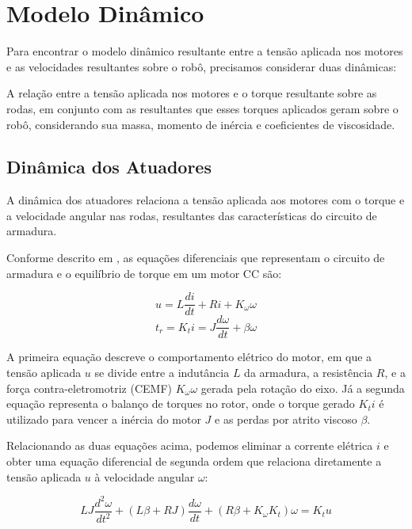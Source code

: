 \section{Modelo Dinâmico}

Para encontrar o modelo dinâmico resultante entre a tensão aplicada nos
motores e as velocidades resultantes sobre o robô, precisamos considerar duas dinâmicas:

\vspace{1em}
A relação entre a tensão aplicada nos motores e o torque resultante sobre as rodas,
em conjunto com as resultantes que esses torques aplicados geram sobre o robô, 
considerando sua massa, momento de inércia e coeficientes de viscosidade.

\subsection{Dinâmica dos Atuadores}

A dinâmica dos atuadores relaciona a tensão aplicada aos motores 
com o torque e a velocidade angular nas rodas, 
resultantes das características do circuito de armadura.

\vspace{1em}
Conforme descrito em \cite{ogata1997modern}, 
as equações diferenciais que representam o circuito de armadura e o equilíbrio de torque em um motor CC são:

\begin{equation}
    u = L \frac{di}{dt} + Ri + K_{\omega} \omega
\end{equation}
\begin{equation}
    t_r = K_{t} i = J \frac{d \omega}{dt} + \beta \omega
\end{equation}

A primeira equação descreve o comportamento elétrico do motor, 
em que a tensão aplicada $u$ se divide entre a indutância $L$ da armadura, 
a resistência $R$, e a força contra-eletromotriz (CEMF) $K_\omega \omega$ 
gerada pela rotação do eixo. Já a segunda equação representa o balanço 
de torques no rotor, onde o torque gerado $K_t i$ é utilizado para vencer 
a inércia do motor $J$ e as perdas por atrito viscoso $\beta$.

\vspace{1em}
Relacionando as duas equações acima, 
podemos eliminar a corrente elétrica $i$ e 
obter uma equação diferencial de segunda ordem que relaciona 
diretamente a tensão aplicada $u$ à velocidade angular $\omega$:

\begin{equation}
    L J \frac{d^2 \omega}{dt^2} + (L \beta + R J) \frac{d \omega}{dt} + (R \beta + K_{\omega} K_{t}) \omega = K_{t} u
\end{equation}

